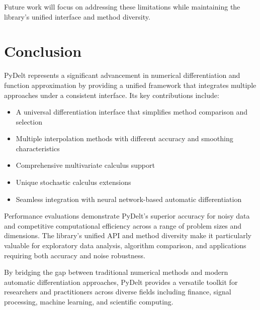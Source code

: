 \documentclass[11pt,a4paper]{article}
\begin{document}
Future work will focus on addressing these limitations while maintaining the library's unified interface and method diversity.

\section{Conclusion}

PyDelt represents a significant advancement in numerical differentiation and function approximation by providing a unified framework that integrates multiple approaches under a consistent interface. Its key contributions include:

\begin{itemize}
    \item A universal differentiation interface that simplifies method comparison and selection
    \item Multiple interpolation methods with different accuracy and smoothing characteristics
    \item Comprehensive multivariate calculus support
    \item Unique stochastic calculus extensions
    \item Seamless integration with neural network-based automatic differentiation
\end{itemize}

Performance evaluations demonstrate PyDelt's superior accuracy for noisy data and competitive computational efficiency across a range of problem sizes and dimensions. The library's unified API and method diversity make it particularly valuable for exploratory data analysis, algorithm comparison, and applications requiring both accuracy and noise robustness.

By bridging the gap between traditional numerical methods and modern automatic differentiation approaches, PyDelt provides a versatile toolkit for researchers and practitioners across diverse fields including finance, signal processing, machine learning, and scientific computing.
\end{document}
